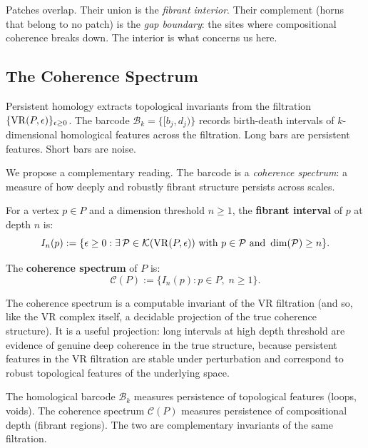 Patches overlap. Their union is the \emph{fibrant interior}. Their complement (horns that belong to no patch) is the \emph{gap boundary}: the sites where compositional coherence breaks down. The interior is what concerns us here.


\subsection{The Coherence Spectrum}

Persistent homology \cite{carlsson2009topology, zomorodian2005computing} extracts topological invariants from the filtration $\{\mathrm{VR}(P, \epsilon)\}_{\epsilon \geq 0}$. The barcode $\mathcal{B}_k = \{[b_j, d_j)\}$ records birth-death intervals of $k$-dimensional homological features across the filtration. Long bars are persistent features. Short bars are noise.

We propose a complementary reading. The barcode is a \emph{coherence spectrum}: a measure of how deeply and robustly fibrant structure persists across scales.

\begin{definition}
\label{def:fibrant-interval}
For a vertex $p \in P$ and a dimension threshold $n \geq 1$, the \textbf{fibrant interval} of $p$ at depth $n$ is:
\[
I_n(p) := \{\epsilon \geq 0 : \exists\, \mathcal{P} \in \mathcal{K}(\mathrm{VR}(P, \epsilon)) \text{ with } p \in \mathcal{P} \text{ and } \dim(\mathcal{P}) \geq n\}.
\]
\end{definition}

\begin{definition}
\label{def:coherence-spectrum}
The \textbf{coherence spectrum} of $P$ is:
\[
\mathcal{C}(P) := \{I_n(p) : p \in P,\; n \geq 1\}.
\]
\end{definition}

The coherence spectrum is a computable invariant of the VR filtration (and so, like the VR complex itself, a decidable projection of the true coherence structure). It is a useful projection: long intervals at high depth threshold are evidence of genuine deep coherence in the true structure, because persistent features in the VR filtration are stable under perturbation \cite{cohen2007stability} and correspond to robust topological features of the underlying space.

\begin{remark}
The homological barcode $\mathcal{B}_k$ measures persistence of topological features (loops, voids). The coherence spectrum $\mathcal{C}(P)$ measures persistence of compositional depth (fibrant regions). The two are complementary invariants of the same filtration.
\end{remark}


